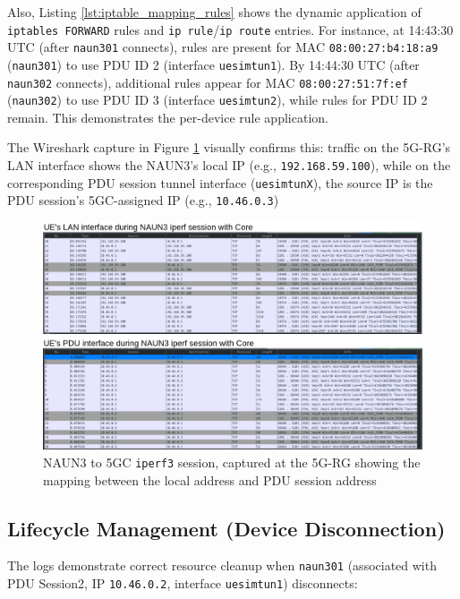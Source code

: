 Also, Listing \ref{lst:iptable_mapping_rules} shows the dynamic application of \texttt{iptables FORWARD} rules and \texttt{ip rule}/\texttt{ip route} entries. For instance, at 14:43:30 \ac{UTC} (after \texttt{naun301} connects), rules are present for \ac{MAC} \texttt{08:00:27:b4:18:a9} (\texttt{naun301}) to use \ac{PDU} ID 2 (interface \texttt{uesimtun1}). By 14:44:30 \ac{UTC} (after \texttt{naun302} connects), additional rules appear for \ac{MAC} \texttt{08:00:27:51:7f:ef} (\texttt{naun302}) to use \ac{PDU} ID 3 (interface \texttt{uesimtun2}), while rules for \ac{PDU} ID 2 remain. This demonstrates the per-device rule application.

The Wireshark capture in Figure \ref{fig:naun3_to_core_ue_view} visually confirms this: traffic on the \ac{5G-RG}'s \ac{LAN} interface shows the \ac{NAUN3}'s local \ac{IP} (e.g., \texttt{192.168.59.100}), while on the corresponding \ac{PDU} session tunnel interface (\texttt{uesimtunX}), the source \ac{IP} is the \ac{PDU} session's \ac{5GC}-assigned \ac{IP} (e.g., \texttt{10.46.0.3})

\begin{figure}
    \centering
    \includegraphics[width=1\linewidth]{figs/naun3_to_core_ue_view.png}
    \caption{\acs{NAUN3} to \acs{5GC} \texttt{iperf3} session, captured at the \acs{5G-RG} showing the mapping between the local address and \acs{PDU} session address}
    \label{fig:naun3_to_core_ue_view}
\end{figure}

\subsection{Lifecycle Management (Device Disconnection)}

The logs demonstrate correct resource cleanup when \texttt{naun301} (associated with \ac{PDU} Session2, \ac{IP} \texttt{10.46.0.2}, interface \texttt{uesimtun1}) disconnects:

